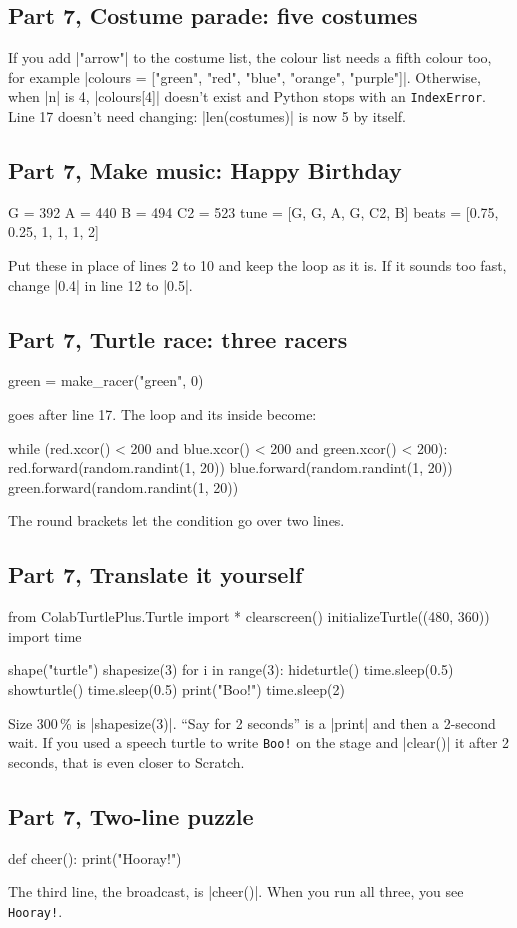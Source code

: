 \subsection*{Part 7, Costume parade: five costumes}
If you add \py|"arrow"| to the costume list, the colour list needs a fifth colour too, for example \py|colours = ["green", "red", "blue", "orange", "purple"]|. Otherwise, when \py|n| is 4, \py|colours[4]| doesn't exist and Python stops with an \texttt{IndexError}. Line 17 doesn't need changing: \py|len(costumes)| is now 5 by itself.

\subsection*{Part 7, Make music: Happy Birthday}
\begin{codenonum}
G = 392
A = 440
B = 494
C2 = 523
tune = [G, G, A, G, C2, B]
beats = [0.75, 0.25, 1, 1, 1, 2]
\end{codenonum}
Put these in place of lines 2 to 10 and keep the loop as it is. If it sounds too fast, change \py|0.4| in line 12 to \py|0.5|.

\subsection*{Part 7, Turtle race: three racers}
\begin{codenonum}
green = make_racer("green", 0)
\end{codenonum}
goes after line 17. The loop and its inside become:
\begin{codenonum}
while (red.xcor() < 200 and blue.xcor() < 200
       and green.xcor() < 200):
    red.forward(random.randint(1, 20))
    blue.forward(random.randint(1, 20))
    green.forward(random.randint(1, 20))
\end{codenonum}
The round brackets let the condition go over two lines.

\subsection*{Part 7, Translate it yourself}
\begin{codenonum}
from ColabTurtlePlus.Turtle import *
clearscreen()
initializeTurtle((480, 360))
import time

shape("turtle")
shapesize(3)
for i in range(3):
    hideturtle()
    time.sleep(0.5)
    showturtle()
    time.sleep(0.5)
print("Boo!")
time.sleep(2)
\end{codenonum}
Size 300\,\% is \py|shapesize(3)|. ``Say for 2 seconds'' is a \py|print| and then a 2-second wait. If you used a speech turtle to write \texttt{Boo!} on the stage and \py|clear()| it after 2 seconds, that is even closer to Scratch.

\subsection*{Part 7, Two-line puzzle}
\begin{codenonum}
def cheer():
    print("Hooray!")
\end{codenonum}
The third line, the broadcast, is \py|cheer()|. When you run all three, you see \texttt{Hooray!}.
